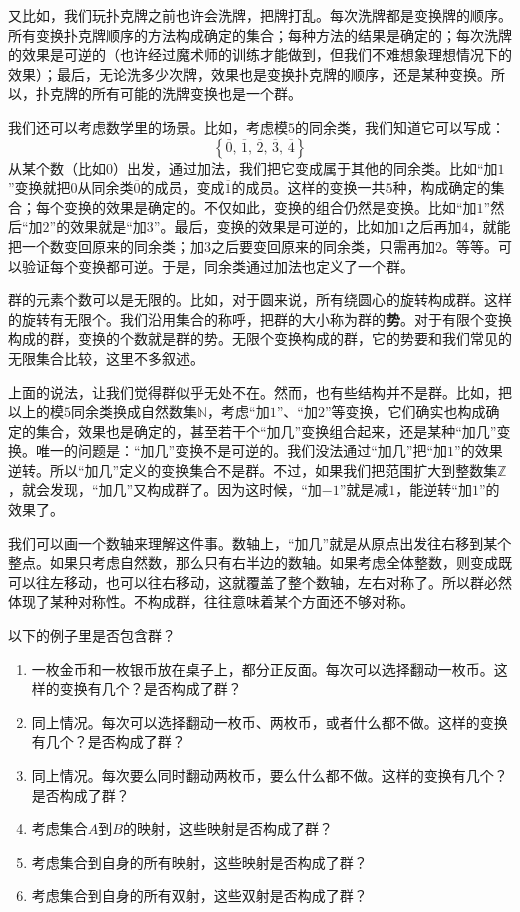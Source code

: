 \documentclass[12pt,UTF8,fontset=none]{ctexbook}
\begin{document}
又比如，我们玩扑克牌之前也许会洗牌，把牌打乱。每次洗牌都是变换牌的顺序。所有变换扑克牌顺序的方法构成确定的集合；每种方法的结果是确定的；每次洗牌的效果是可逆的（也许经过魔术师的训练才能做到，但我们不难想象理想情况下的效果）；最后，无论洗多少次牌，效果也是变换扑克牌的顺序，还是某种变换。所以，扑克牌的所有可能的洗牌变换也是一个群。

我们还可以考虑数学里的场景。比如，考虑模$5$的同余类，我们知道它可以写成：
$$ \left\{\overline{0},\,\overline{1},\,\overline{2},\,\overline{3},\,\overline{4}\right\} $$
从某个数（比如$0$）出发，通过加法，我们把它变成属于其他的同余类。比如“加$1$”变换就把$0$从同余类$\overline{0}$的成员，变成$\overline{1}$的成员。这样的变换一共$5$种，构成确定的集合；每个变换的效果是确定的。不仅如此，变换的组合仍然是变换。比如“加$1$”然后“加$2$”的效果就是“加$3$”。最后，变换的效果是可逆的，比如加$1$之后再加$4$，就能把一个数变回原来的同余类；加$3$之后要变回原来的同余类，只需再加$2$。等等。可以验证每个变换都可逆。于是，同余类通过加法也定义了一个群。

群的元素个数可以是无限的。比如，对于圆来说，所有绕圆心的旋转构成群。这样的旋转有无限个。我们沿用集合的称呼，把群的大小称为群的\textbf{势}。对于有限个变换构成的群，变换的个数就是群的势。无限个变换构成的群，它的势要和我们常见的无限集合比较，这里不多叙述。

上面的说法，让我们觉得群似乎无处不在。然而，也有些结构并不是群。比如，把以上的模$5$同余类换成自然数集$\mathbb{N}$，考虑“加$1$”、“加$2$”等变换，它们确实也构成确定的集合，效果也是确定的，甚至若干个“加几”变换组合起来，还是某种“加几”变换。唯一的问题是：“加几”变换不是可逆的。我们没法通过“加几”把“加$1$”的效果逆转。所以“加几”定义的变换集合不是群。不过，如果我们把范围扩大到整数集$\mathbb{Z}$，就会发现，“加几”又构成群了。因为这时候，“加$-1$”就是减$1$，能逆转“加$1$”的效果了。

我们可以画一个数轴来理解这件事。数轴上，“加几”就是从原点出发往右移到某个整点。如果只考虑自然数，那么只有右半边的数轴。如果考虑全体整数，则变成既可以往左移动，也可以往右移动，这就覆盖了整个数轴，左右对称了。所以群必然体现了某种对称性。不构成群，往往意味着某个方面还不够对称。

\begin{et}
    以下的例子里是否包含群？
    \begin{enumerate}[label=\arabic*).]
        \item 一枚金币和一枚银币放在桌子上，都分正反面。每次可以选择翻动一枚币。这样的变换有几个？是否构成了群？
        \item 同上情况。每次可以选择翻动一枚币、两枚币，或者什么都不做。这样的变换有几个？是否构成了群？
        \item 同上情况。每次要么同时翻动两枚币，要么什么都不做。这样的变换有几个？是否构成了群？
        \item 考虑集合$A$到$B$的映射，这些映射是否构成了群？
        \item 考虑集合到自身的所有映射，这些映射是否构成了群？
        \item 考虑集合到自身的所有双射，这些双射是否构成了群？
    \end{enumerate}
\end{et}
\end{document}
